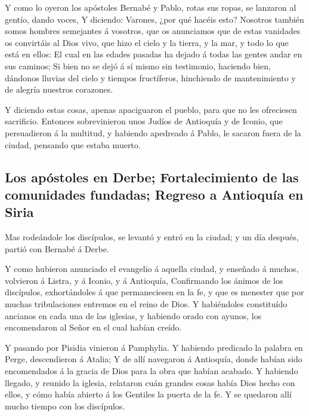  Y como lo oyeron los apóstoles Bernabé y Pablo, rotas sus
ropas, se lanzaron al gentío, dando voces,  Y diciendo:
Varones, ¿por qué hacéis esto? Nosotros también somos hombres semejantes
á vosotros, que os anunciamos que de estas vanidades os convirtáis al
Dios vivo, que hizo el cielo y la tierra, y la mar, y todo lo que está
en ellos:  El cual en las edades pasadas ha dejado á todas
las gentes andar en sus caminos;  Si bien no se dejó á sí
mismo sin testimonio, haciendo bien, dándonos lluvias del cielo y
tiempos fructíferos, hinchiendo de mantenimiento y de alegría nuestros
corazones.

 Y diciendo estas cosas, apenas apaciguaron el pueblo, para
que no les ofreciesen sacrificio.  Entonces sobrevinieron
unos Judíos de Antioquía y de Iconio, que persuadieron á la multitud, y
habiendo apedreado á Pablo, le sacaron fuera de la ciudad, pensando que
estaba muerto.

\hypertarget{los-apuxf3stoles-en-derbe-fortalecimiento-de-las-comunidades-fundadas-regreso-a-antioquuxeda-en-siria}{%
\subsection{Los apóstoles en Derbe; Fortalecimiento de las comunidades
fundadas; Regreso a Antioquía en
Siria}\label{los-apuxf3stoles-en-derbe-fortalecimiento-de-las-comunidades-fundadas-regreso-a-antioquuxeda-en-siria}}

 Mas rodeándole los discípulos, se levantó y entró en la
ciudad; y un día después, partió con Bernabé á Derbe.

 Y como hubieron anunciado el evangelio á aquella ciudad, y
enseñado á muchos, volvieron á Listra, y á Iconio, y á Antioquía,
 Confirmando los ánimos de los discípulos, exhortándoles á
que permaneciesen en la fe, y que es menester que por muchas
tribulaciones entremos en el reino de Dios.  Y habiéndoles
constituído ancianos en cada una de las iglesias, y habiendo orado con
ayunos, los encomendaron al Señor en el cual habían creído.

 Y pasando por Pisidia vinieron á Pamphylia. 
Y habiendo predicado la palabra en Perge, descendieron á Atalia;
 Y de allí navegaron á Antioquía, donde habían sido
encomendados á la gracia de Dios para la obra que habían acabado.
 Y habiendo llegado, y reunido la iglesia, relataron cuán
grandes cosas había Dios hecho con ellos, y cómo había abierto á los
Gentiles la puerta de la fe.  Y se quedaron allí mucho
tiempo con los discípulos.

